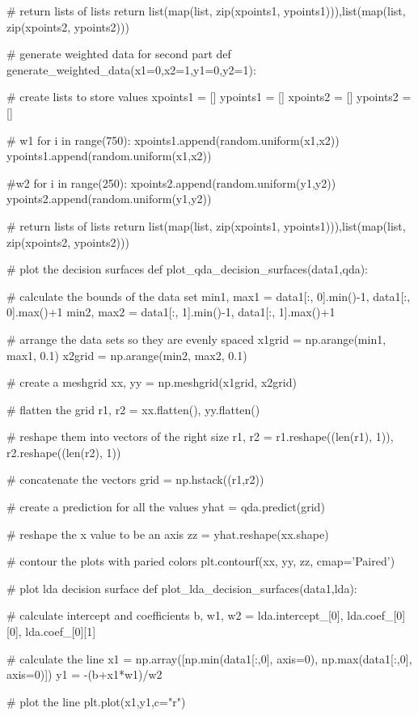 \documentclass{article}
\begin{document}
{\begin{python}
	# return lists of lists
	return list(map(list, zip(xpoints1, ypoints1))),list(map(list, zip(xpoints2, ypoints2)))

# generate weighted data for second part
def generate_weighted_data(x1=0,x2=1,y1=0,y2=1):

	# create lists to store values
	xpoints1 = []
	ypoints1 = []
	xpoints2 = []
	ypoints2 = []

	# w1        
	for i in range(750):
		xpoints1.append(random.uniform(x1,x2))
		ypoints1.append(random.uniform(x1,x2))

	#w2
	for i in range(250):
		xpoints2.append(random.uniform(y1,y2))
		ypoints2.append(random.uniform(y1,y2))
	
	# return lists of lists
	return list(map(list, zip(xpoints1, ypoints1))),list(map(list, zip(xpoints2, ypoints2)))

# plot the decision surfaces
def plot_qda_decision_surfaces(data1,qda):

	# calculate the bounds of the data set
	min1, max1 = data1[:, 0].min()-1, data1[:,  0].max()+1
	min2, max2 = data1[:, 1].min()-1, data1[:, 1].max()+1

	# arrange the data sets so they are evenly spaced
	x1grid = np.arange(min1, max1, 0.1)
	x2grid = np.arange(min2, max2, 0.1)

	# create a meshgrid
	xx, yy = np.meshgrid(x1grid, x2grid)

	# flatten the grid
	r1, r2 = xx.flatten(), yy.flatten()

	# reshape them into vectors of the right size
	r1, r2 = r1.reshape((len(r1), 1)), r2.reshape((len(r2), 1))
	
	# concatenate the vectors
	grid = np.hstack((r1,r2))

	# create a prediction for all the values
	yhat = qda.predict(grid)

	# reshape the x value to be an axis
	zz = yhat.reshape(xx.shape)

	# contour the plots with paried colors
	plt.contourf(xx, yy, zz, cmap='Paired')
		
# plot lda decision surface
def plot_lda_decision_surfaces(data1,lda):

	# calculate intercept and coefficients
	b, w1, w2 = lda.intercept_[0], lda.coef_[0][0], lda.coef_[0][1]    

	# calculate the line
	x1 = np.array([np.min(data1[:,0], axis=0), np.max(data1[:,0], axis=0)])
	y1 = -(b+x1*w1)/w2

	# plot the line
	plt.plot(x1,y1,c="r")
	


\end{python}}
\end{document}
